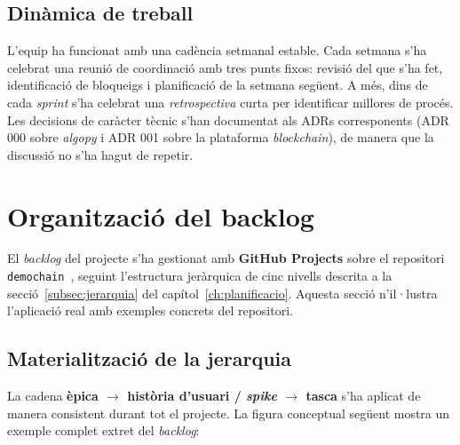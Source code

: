 \subsection{Dinàmica de treball}
\label{subsec:dinamica-de-treball}

L'equip ha funcionat amb una cadència setmanal estable.
Cada setmana s'ha celebrat una reunió de coordinació amb tres punts fixos: revisió del que s'ha fet, identificació de
bloqueigs i planificació de la setmana següent.
A més, dins de cada \emph{sprint} s'ha celebrat una \emph{retrospectiva} curta per identificar millores de procés.
Les decisions de caràcter tècnic s'han documentat als \acp{ADR} corresponents (\ac{ADR} 000 sobre \emph{algopy} i
\ac{ADR} 001 sobre la plataforma \emph{blockchain}), de manera que la discussió no s'ha hagut de repetir.



\section{Organització del backlog}
\label{sec:backlog-desenv}

El \emph{backlog} del projecte s'ha gestionat amb \textbf{GitHub Projects} sobre el repositori
\texttt{demochain}~\cite{demochainrepo}, seguint l'estructura jeràrquica de cinc nivells descrita a la
secció~\ref{subsec:jerarquia} del capítol~\ref{ch:planificacio}.
Aquesta secció n'il·lustra l'aplicació real amb exemples concrets del repositori.

\subsection{Materialització de la jerarquia}
\label{subsec:materialitzacio-jerarquia}

La cadena \textbf{èpica $\rightarrow$ història d'usuari / \emph{spike} $\rightarrow$ tasca} s'ha aplicat de manera
consistent durant tot el projecte.
La figura conceptual següent mostra un exemple complet extret del \emph{backlog}:


